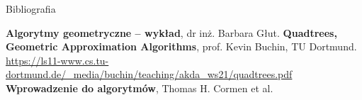 \documentclass[aspectratio=169,dvipsnames]{beamer}
\begin{document}
\begin{frame}{Bibliografia}
    \begin{thebibliography}{9}
         \textbf{Algorytmy geometryczne -- wykład}, dr inż. Barbara Głut.
         \textbf{Quadtrees, Geometric Approximation Algorithms}, prof. Kevin Buchin, TU Dortmund.
            \url{https://ls11-www.cs.tu-dortmund.de/_media/buchin/teaching/akda_ws21/quadtrees.pdf}
             \textbf{Wprowadzenie do algorytmów}, Thomas H. Cormen et al.
    \end{thebibliography}
\end{frame}
\end{document}
